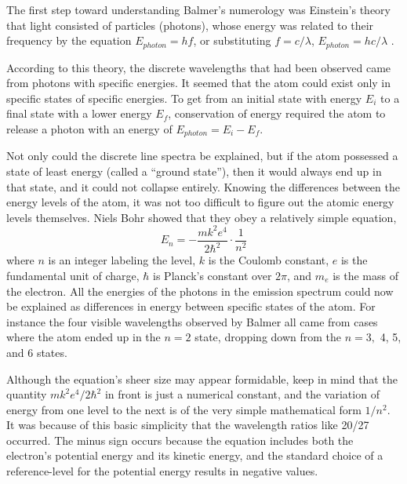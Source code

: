 The first step toward understanding Balmer's numerology was
Einstein's theory that light consisted of particles
(photons), whose energy was related to their frequency by
the equation $E_{photon}=hf$, or substituting
$f=c/\lambda$, $E_{photon}=hc/\lambda$  .

According to this theory, the discrete wavelengths that had
been observed came from photons with specific energies. It
seemed that the atom could exist only in specific states of
specific energies. To get from an initial state with energy
$E_i$ to a final state with a lower energy $E_f$, conservation
of energy required the atom to release a photon with an
energy of $E_{photon}=E_i-E_f$. 

Not only could the discrete line spectra be explained, but
if the atom possessed a state of least energy (called a
``ground state''), then it would always end up in that
state, and it could not collapse entirely. Knowing the
differences between the energy levels of the atom, it was
not too difficult to figure out the atomic energy levels
themselves. Niels Bohr showed that they obey a relatively simple equation,\label{bohr-equation}
\begin{equation*}
	E_n = -\frac{mk^2e^4}{2\hbar^2}\cdot\frac{1}{n^2}
\end{equation*}
where $n$ is an integer labeling the level, $k$ is the
Coulomb constant, $e$ is the fundamental unit of charge, $\hbar$
is Planck's constant over $2\pi$, and $m_e$ is the mass of the electron.
All the energies of the photons in the emission spectrum
could now be explained as differences in energy between
specific states of the atom. For instance the four visible
wavelengths observed by Balmer all came from cases where the
atom ended up in the $n=2$ state, dropping down from the
$n=3,$ 4, 5, and 6 states.

Although the equation's sheer size may appear for\-mid\-ab\-le,
keep in mind that the quantity $mk^2e^4/2\hbar^2$ in front is just a
numerical constant, and the variation of energy from one
level to the next is of the very simple mathematical form
$1/n^2$. It was because of this basic simplicity that the
wavelength ratios like 20/27 occurred. The minus sign occurs
because the equation includes both the electron's potential
energy and its kinetic energy, and the standard choice of a
reference-level for the potential energy results in negative values. 

